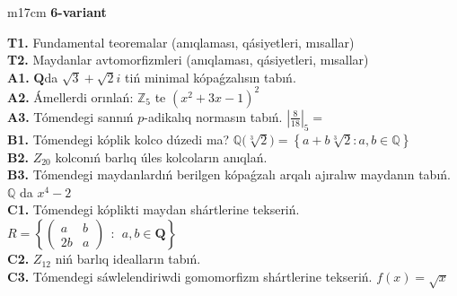 \documentclass{article}
\begin{document}
\begin{tabular}{m{17cm}}
\textbf{6-variant}
\newline

\textbf{T1.} Fundamental teoremalar (anıqlaması, qásiyetleri, mısallar) \\
\textbf{T2.} Maydanlar avtomorfizmleri (anıqlaması, qásiyetleri, mısallar) \\
\textbf{A1.} \(\mathbf{Q}\)da \(\sqrt{3} + \sqrt{2}i\) tiń minimal kópaǵzalısın tabıń. \\
\textbf{A2.} Ámellerdi orınlań: \(\mathbb{Z}_{5}\) te \(\left( x^{2} + 3x - 1 \right)^{2}\) \\
\textbf{A3.} Tómendegi sannıń \(p\)-adikalıq normasın tabıń. \(|\frac{8}{18}|_{5} =\) \\
\textbf{B1.} Tómendegi kóplik kolco dúzedi ma? \(\mathbb{Q(}\sqrt[3]{2}) = \left\{ a + b\sqrt[3]{2}:a,b \in \mathbb{Q} \right\}\) \\
\textbf{B2.} \(Z_{20}\) kolconıń barlıq úles kolcoların anıqlań. \\
\textbf{B3.} Tómendegi maydanlardıń berilgen kópaǵzalı arqalı ajıralıw maydanın tabıń. \(\mathbb{Q}\) da \(x^{4} - 2\) \\
\textbf{C1.} Tómendegi kóplikti maydan shártlerine tekseriń. \(R = \left\{ \begin{pmatrix}
a & b \\
2b & a
\end{pmatrix}\ \ :\ \ a,b \in \mathbf{Q} \right\}\) \\
\textbf{C2.} \(Z_{12}\) niń barlıq idealların tabıń. \\
\textbf{C3.} Tómendegi sáwlelendiriwdi gomomorfizm shártlerine tekseriń. \(f(x) = \sqrt{x}\) \\

\end{tabular}
\vspace{1cm}
\end{document}
